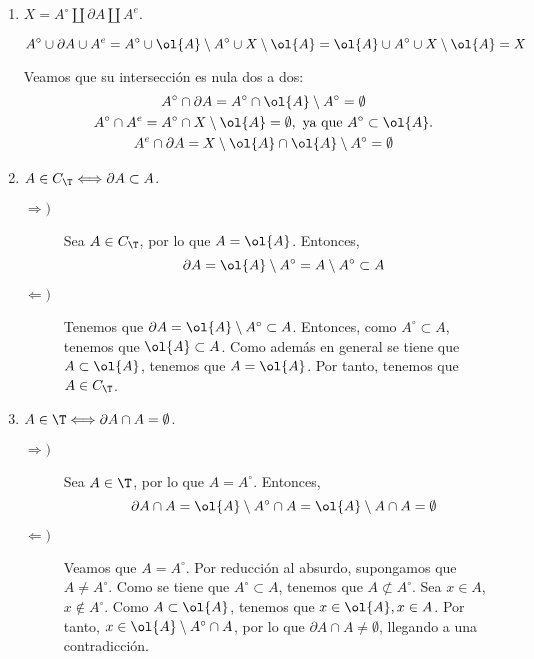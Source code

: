 \begin{enumerate}
    
    \item $X=A^\circ \amalg \partial A \amalg A^e$.

    \begin{equation*}
        A^\circ \cup \partial A \cup A^e = 
        A^\circ \cup \ol{A}\setminus {A^\circ} \cup X\setminus \ol{A} = \ol{A}\cup A^\circ \cup X\setminus \ol{A} = X
    \end{equation*}

    Veamos que su intersección es nula dos a dos:
    \begin{gather*}
        A^\circ \cap \partial A= 
        A^\circ \cap \ol{A}\setminus {A^\circ} = \emptyset \\
        A^\circ \cap A^e= 
        A^\circ \cap X\setminus \ol{A} = \emptyset,\text{ ya que } A^\circ \subset \ol{A}. \\
        A^e \cap \partial A= 
        X\setminus \ol{A} \cap \ol{A}\setminus {A^\circ} = \emptyset
    \end{gather*}
    
    \item $A\in C_\T\Longleftrightarrow \partial A\subset A$.
    \begin{description}
        \item[$\Longrightarrow)$] Sea $A\in C_\T$, por lo que $A=\ol{A}$. Entonces,
        $$\partial A = \ol{A}\setminus A^\circ = A\setminus A^\circ \subset A$$

        \item[$\Longleftarrow)$] Tenemos que $\partial A=\ol{A}\setminus A^\circ \subset A$. Entonces, como $A^\circ \subset A$, tenemos que $\ol{A}\subset A$. Como además en general se tiene que $A\subset \ol{A}$, tenemos que $A=\ol{A}$. Por tanto, tenemos que $A\in C_\T$.
    \end{description}
    
    \item $A\in \T\Longleftrightarrow \partial A\cap A=\emptyset$.
    \begin{description}
        \item[$\Longrightarrow)$] Sea $A\in \T$, por lo que $A=A^\circ$. Entonces,
        $$\partial A \cap A = \ol{A}\setminus A^\circ \cap A = \ol{A}\setminus A \cap A = \emptyset$$

        \item[$\Longleftarrow)$] Veamos que $A=A^\circ$. Por reducción al absurdo, supongamos que $A\neq A^\circ$. Como se tiene que $A^\circ \subset A$, tenemos que $A\not \subset A^\circ$. Sea $x\in A$, $x\notin A^\circ$. Como $A\subset \ol{A}$, tenemos que $x\in \ol{A},x\in A$. Por tanto, $x\in \ol{A}\setminus A^\circ \cap A$, por lo que $\partial A\cap A\neq \emptyset$, llegando a una contradicción.


\end{description}
\end{enumerate}
